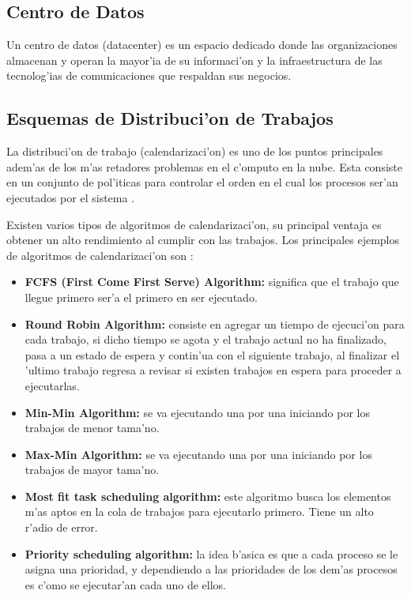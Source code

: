 \subsection*{Centro de Datos}
Un centro de datos (datacenter) es un espacio dedicado donde las organizaciones almacenan y operan la mayor'ia de su informaci'on y la infraestructura de las tecnolog'ias de comunicaciones que respaldan sus negocios.\cite{whatisdatacenter}

\subsection*{Esquemas de Distribuci'on de Trabajos}

La distribuci'on de trabajo (calendarizaci'on) es uno de los puntos principales adem'as de los m'as retadores problemas en el c'omputo en la nube\cite{li2014greedy}. Esta consiste en un conjunto de pol'iticas para controlar el orden en el cual los procesos ser'an ejecutados por el sistema \cite{agarwal2014efficient}.

Existen varios tipos de algoritmos de calendarizaci'on, su principal ventaja es obtener un alto rendimiento al cumplir con las trabajos. Los principales ejemplos de algoritmos de calendarizaci'on son \cite{salot2013survey}:

\begin{itemize}
\item \textbf{FCFS (First Come First Serve) Algorithm:} significa que el trabajo que llegue primero ser'a el primero en ser ejecutado.
\item \textbf{Round Robin Algorithm:} consiste en agregar un tiempo de ejecuci'on para cada trabajo, si dicho tiempo se agota y el trabajo actual no ha finalizado, pasa a un estado de espera y contin'ua con el siguiente trabajo, al finalizar el 'ultimo trabajo regresa a revisar si existen trabajos en espera para proceder a ejecutarlas. 
\item  \textbf{Min-Min Algorithm:} se va ejecutando una por una iniciando por los trabajos de menor tama'no.
\item  \textbf{Max-Min Algorithm:} se va ejecutando una por una iniciando por los trabajos de mayor tama'no.
\item  \textbf{Most fit task scheduling algorithm:} este algoritmo busca los elementos m'as aptos en la cola de trabajos para ejecutarlo primero. Tiene un alto r'adio de error.
\item \textbf{Priority scheduling algorithm:} la idea b'asica es que a cada proceso se le asigna una prioridad, y dependiendo a las prioridades de los dem'as procesos es c'omo se ejecutar'an cada uno de ellos.
\end{itemize}

